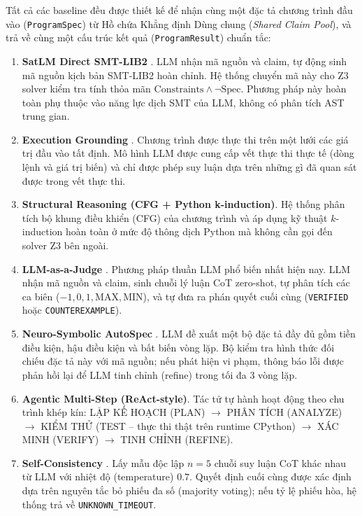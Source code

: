 Tất cả các baseline đều được thiết kế để nhận cùng một đặc tả chương trình đầu vào (\texttt{ProgramSpec}) từ Hồ chứa Khẳng định Dùng chung (\textit{Shared Claim Pool}), và trả về cùng một cấu trúc kết quả (\texttt{ProgramResult}) chuẩn tắc:

\begin{enumerate}
    \item[\textbf{Baseline A:}] \textbf{SatLM Direct SMT-LIB2} \cite{ye2023satlm}. LLM nhận mã nguồn và claim, tự động sinh mã nguồn kịch bản SMT-LIB2 hoàn chỉnh. Hệ thống chuyển mã này cho Z3 solver kiểm tra tính thỏa mãn $\text{Constraints} \land \neg \text{Spec}$. Phương pháp này hoàn toàn phụ thuộc vào năng lực dịch SMT của LLM, không có phân tích AST trung gian.
    \item[\textbf{Baseline B:}] \textbf{Execution Grounding} \cite{gu2024cruxeval,thakur2026think}. Chương trình được thực thi trên một lưới các giá trị đầu vào tất định. Mô hình LLM được cung cấp vết thực thi thực tế (dòng lệnh và giá trị biến) và chỉ được phép suy luận dựa trên những gì đã quan sát được trong vết thực thi.
    \item[\textbf{Baseline C:}] \textbf{Structural Reasoning (CFG + Python k-induction)}. Hệ thống phân tích bộ khung điều khiển (CFG) của chương trình và áp dụng kỹ thuật $k$-induction hoàn toàn ở mức độ thông dịch Python mà không cần gọi đến solver Z3 bên ngoài.
    \item[\textbf{Baseline D:}] \textbf{LLM-as-a-Judge} \cite{gu2024cruxeval}. Phương pháp thuần LLM phổ biến nhất hiện nay. LLM nhận mã nguồn và claim, sinh chuỗi lý luận CoT zero-shot, tự phân tích các ca biên ($-1, 0, 1, \text{MAX}, \text{MIN}$), và tự đưa ra phán quyết cuối cùng (\texttt{VERIFIED} hoặc \texttt{COUNTEREXAMPLE}).
    \item[\textbf{Baseline E:}] \textbf{Neuro-Symbolic AutoSpec} \cite{wen2024autospec}. LLM đề xuất một bộ đặc tả đầy đủ gồm tiền điều kiện, hậu điều kiện và bất biến vòng lặp. Bộ kiểm tra hình thức đối chiếu đặc tả này với mã nguồn; nếu phát hiện vi phạm, thông báo lỗi được phản hồi lại để LLM tinh chỉnh (refine) trong tối đa 3 vòng lặp.
    \item[\textbf{Baseline F:}] \textbf{Agentic Multi-Step (ReAct-style)}. Tác tử tự hành hoạt động theo chu trình khép kín: LẬP KẾ HOẠCH (PLAN) $\rightarrow$ PHÂN TÍCH (ANALYZE) $\rightarrow$ KIỂM THỬ (TEST -- thực thi thật trên runtime CPython) $\rightarrow$ XÁC MINH (VERIFY) $\rightarrow$ TINH CHỈNH (REFINE).
    \item[\textbf{Baseline G:}] \textbf{Self-Consistency} \cite{wang2022self}. Lấy mẫu độc lập $n = 5$ chuỗi suy luận CoT khác nhau từ LLM với nhiệt độ (temperature) $0.7$. Quyết định cuối cùng được xác định dựa trên nguyên tắc bỏ phiếu đa số (majority voting); nếu tỷ lệ phiếu hòa, hệ thống trả về \texttt{UNKNOWN\_TIMEOUT}.

\end{enumerate}
